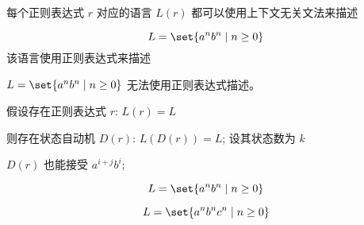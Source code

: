 \begin{frame}{}
  \begin{center}
    每个正则表达式 $r$ 对应的语言 $L(r)$ 都可以使用上下文无关文法来描述
  \end{center}
\end{frame}

\begin{frame}{}
  \begin{center}
    

    \[
      L = \set{a^{n} b^{n} \mid n \ge 0}
    \]
    该语言使用正则表达式来描述
  \end{center}
\end{frame}

\begin{frame}{}
  \begin{theorem}
    $L = \set{a^{n} b^{n} \mid n \ge 0}$ 无法使用正则表达式描述。
  \end{theorem}

  \pause
  \begin{center}

    \pause
    \vspace{0.30cm}
    假设存在正则表达式 $r$: $L(r) = L$

    \pause
    \vspace{0.30cm}
    则存在状态自动机 $D(r)$: $L(D(r)) = L$; 设其状态数为 $k$

    \pause
    \vspace{0.30cm}

    \pause
    \vspace{0.30cm}
    $D(r)$ 也能接受 $a^{i+j} b^{i}$; 
  \end{center}
\end{frame}

\begin{frame}{}
  \begin{center}
    \[
      L = \set{a^{n}b^{n} \mid n \ge 0}
    \]
    \href{https://en.wikipedia.org/wiki/Pumping\_lemma\_for\_regular\_languages}{
      }

    \pause
    \vspace{0.60cm}
    \[
      L = \set{a^{n}b^{n}c^{n} \mid n \ge 0}
    \]
    \href{https://en.wikipedia.org/wiki/Pumping\_lemma\_for\_context-free\_languages}{
      }
  \end{center}
\end{frame}
